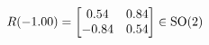 \documentclass[preview]{standalone}
\begin{document}
\begin{align*}
\special{dvisvgm:raw <g id='unique000'>}R(-1.00) = \begin{bmatrix} 0.54 & 0.84 \\ -0.84 & 0.54 \end{bmatrix} \in \text{SO}(2)\special{dvisvgm:raw </g>}
\end{align*}
\end{document}
